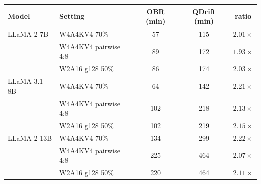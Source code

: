 \begin{tabular}{llccc}
\toprule
Model & Setting & OBR (min) & QDrift (min) & ratio \\
\midrule
LLaMA-2-7B & W4A4KV4 70\% & 57 & 115 & $2.01\times$ \\
 & W4A4KV4 pairwise 4:8 & 89 & 172 & $1.93\times$ \\
 & W2A16 g128 50\% & 86 & 174 & $2.03\times$ \\
\midrule
LLaMA-3.1-8B & W4A4KV4 70\% & 64 & 142 & $2.21\times$ \\
 & W4A4KV4 pairwise 4:8 & 102 & 218 & $2.13\times$ \\
 & W2A16 g128 50\% & 102 & 219 & $2.15\times$ \\
\midrule
LLaMA-2-13B & W4A4KV4 70\% & 134 & 299 & $2.22\times$ \\
 & W4A4KV4 pairwise 4:8 & 225 & 464 & $2.07\times$ \\
 & W2A16 g128 50\% & 220 & 464 & $2.11\times$ \\
\bottomrule
\end{tabular}
